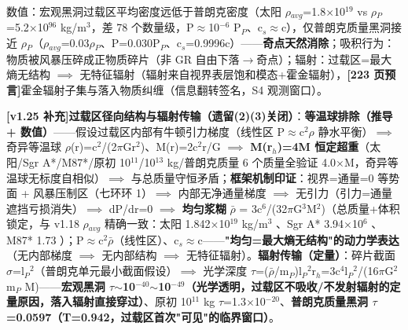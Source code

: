 \documentclass[12pt]{article}
\newcommand{\mtag}[1]{\textbf{[#1]}}
\newcommand{\up}[1]{\ensuremath{^{#1}}}
\newcommand{\down}[1]{\ensuremath{_{#1}}}
\begin{document}
数值：宏观黑洞过载区平均密度远低于普朗克密度（太阳 \ensuremath{\rho}\down{avg}=1.8\ensuremath{\times}10\up{19} vs \ensuremath{\rho}\down{P}=5.2\ensuremath{\times}10\up{96} kg/m\up{3}，差 78 个数量级，P\ensuremath{\approx}10\up{-6} P\down{P}、c\down{s}\ensuremath{\approx}c），仅普朗克质量黑洞接近 \ensuremath{\rho}\down{P}（\ensuremath{\rho}\down{avg}=0.03\ensuremath{\rho}\down{P}、P=0.030P\down{P}、c\down{s}=0.9996c）------\textbf{奇点天然消除}；吸积行为：物质被风暴压碎成正物质碎片（非 GR 自由下落\ensuremath{\to}奇点）；辐射：过载区=最大熵无结构 \ensuremath{\implies} 无特征辐射（辐射来自视界表层饱和模态+霍金辐射），\mtag{223 页预言}霍金辐射子集与落入物质纠缠（信息翻转签名，S4 观测窗口）。

\textbf{\mtag{v1.25 补充}过载区径向结构与辐射传输（遗留(2)(3)关闭）}：\textbf{等温球排除（推导 + 数值）}------假设过载区内部有牛顿引力梯度（线性区 P\ensuremath{\approx}c\up{2}\ensuremath{\rho} 静水平衡）\ensuremath{\implies} 奇异等温球 \ensuremath{\rho}(r)=c\up{2}/(2\ensuremath{\pi}Gr\up{2})、M(r)=2c\up{2}r/G \ensuremath{\implies} \textbf{M(r\down{h})=4M 恒定超重}（太阳/Sgr A*/M87*/原初 10\up{11}/10\up{13} kg/普朗克质量 6 个质量全验证 4.0\ensuremath{\times}M，奇异等温球无标度自相似）\ensuremath{\implies} 与总质量守恒矛盾；\textbf{框架机制印证}：视界=通量=0 等势面 + 风暴压制区（七环环 1）\ensuremath{\implies} 内部无净通量梯度 \ensuremath{\implies} 无引力（引力=通量遮挡亏损消失）\ensuremath{\implies} dP/dr=0 \ensuremath{\implies} \textbf{均匀浆糊} \ensuremath{\bar{\rho}} = 3c\up{6}/(32\ensuremath{\pi}G\up{3}M\up{2})（总质量+体积锁定，与 v1.18 \ensuremath{\rho}\down{avg} 精确一致：太阳 1.842\ensuremath{\times}10\up{19} kg/m\up{3} \checkmark、Sgr A* 3.94\ensuremath{\times}10\up{6} \checkmark、M87* 1.73 \checkmark）；P\ensuremath{\approx}c\up{2}\ensuremath{\bar{\rho}}（线性区）、c\down{s}\ensuremath{\approx}c------\textbf{"均匀=最大熵无结构"的动力学表达}（无内部梯度 \ensuremath{\implies} 无内部结构 \ensuremath{\implies} 无特征辐射）。\textbf{辐射传输（定量）}：碎片截面 \ensuremath{\sigma}=l\down{P}\up{2}（普朗克单元最小截面假设）\ensuremath{\implies} 光学深度 \ensuremath{\tau}=(\ensuremath{\bar{\rho}}/m\down{P})l\down{P}\up{2}r\down{h}=3c\up{4}l\down{P}\up{2}/(16\ensuremath{\pi}G\up{2}m\down{P} M)------\textbf{宏观黑洞 \ensuremath{\tau}\ensuremath{\sim}10\up{-40}\ensuremath{\sim}10\up{-49}（光学透明，过载区不吸收/不发射辐射的定量原因，落入辐射直接穿过）}、原初 10\up{11} kg \ensuremath{\tau}=1.3\ensuremath{\times}10\up{-20}、\textbf{普朗克质量黑洞 \ensuremath{\tau}=0.0597（T=0.942，过载区首次"可见"的临界窗口）}。
\end{document}
